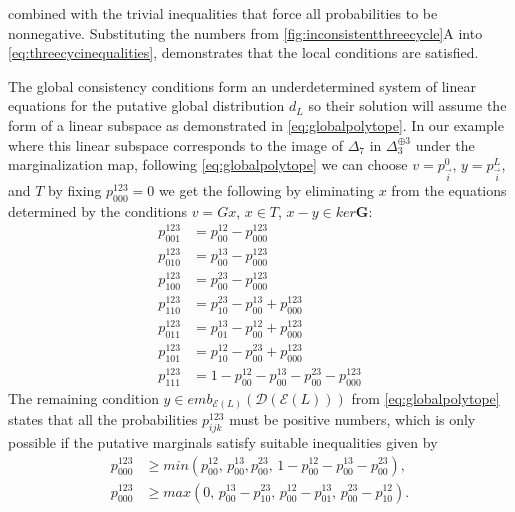 combined with the trivial inequalities that force all probabilities to be nonnegative. Substituting the numbers from \ref{fig:inconsistentthreecycle}A into \ref{eq:threecycinequalities}, demonstrates that the local conditions are satisfied.

The global consistency conditions form an underdetermined system of linear equations for the putative global distribution $d_{L}$ so their solution will assume the form of a linear subspace as demonstrated in \ref{eq:globalpolytope}.  In our example where this linear subspace corresponds to the image of $\Delta_7$ in $\Delta_3^{\oplus 3}$ under the marginalization map, following \ref{eq:globalpolytope} we can choose $v=p^0_{\vec{i}}$, $y=p^L_{\vec{i}}$, and $T$ by fixing $p^{123}_{000}=0$ we get the following by eliminating $x$ from the equations determined by the conditions $v=Gx$, $x \in T$, $x-y \in ker \mathbf{G}$:
\begin{equation}
\begin{aligned}\label{eq:globalpositivityeqs}
p^{123}_{001} &= p^{12}_{00} - p^{123}_{000} \\
p^{123}_{010} &= p^{13}_{00} - p^{123}_{000} \\
p^{123}_{100} &= p^{23}_{00} - p^{123}_{000} \\
p^{123}_{110} &= p^{23}_{10} - p^{13}_{00} + p^{123}_{000} \\
p^{123}_{011} &= p^{13}_{01} - p^{12}_{00} + p^{123}_{000} \\
p^{123}_{101} &= p^{12}_{10} - p^{23}_{00} + p^{123}_{000} \\
p^{123}_{111} &= 1 - p^{12}_{00} - p^{13}_{00} - p^{23}_{00} - p^{123}_{000}
\end{aligned}
\end{equation}
The remaining condition $y \in emb_{\mathcal{E}(L)}(\mathcal{D}(\mathcal{E}(L)))$ from \ref{eq:globalpolytope} states that all the probabilities $p^{123}_{ijk}$ must be positive numbers, which is only possible if the putative marginals satisfy suitable inequalities given by
\begin{equation}
\begin{aligned}\label{eq:globalpositivityineqs}
p^{123}_{000} &\geq min(p^{12}_{00},\, p^{13}_{00},p^{23}_{00},\, 1 - p^{12}_{00} - p^{13}_{00} - p^{23}_{00}),\\
 p^{123}_{000} &\geq max(0,\, p^{13}_{00}-p^{23}_{10},\, p^{12}_{00}-p^{13}_{01},\, p^{23}_{00}-p^{12}_{10}).
\end{aligned}
\end{equation}
